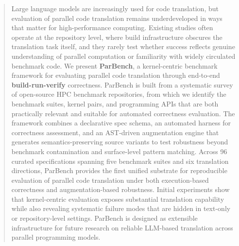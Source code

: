 \documentclass{article}
\begin{document}
\begin{abstract}
Large language models are increasingly used for code translation, but evaluation of parallel code translation remains underdeveloped in ways that matter for high-performance computing. Existing studies often operate at the repository level, where build infrastructure obscures the translation task itself, and they rarely test whether success reflects genuine understanding of parallel computation or familiarity with widely circulated benchmark code. We present \textbf{ParBench}, a kernel-centric benchmark framework for evaluating parallel code translation through end-to-end \textbf{build-run-verify} correctness. ParBench is built from a systematic survey of open-source HPC benchmark repositories, from which we identify the benchmark suites, kernel pairs, and programming APIs that are both practically relevant and suitable for automated correctness evaluation. The framework combines a declarative spec schema, an automated harness for correctness assessment, and an AST-driven augmentation engine that generates semantics-preserving source variants to test robustness beyond benchmark contamination and surface-level pattern matching. Across 96 curated specifications spanning five benchmark suites and six translation directions, ParBench provides the first unified substrate for reproducible evaluation of parallel code translation under both execution-based correctness and augmentation-based robustness. Initial experiments show that kernel-centric evaluation exposes substantial translation capability while also revealing systematic failure modes that are hidden in text-only or repository-level settings. ParBench is designed as extensible infrastructure for future research on reliable LLM-based translation across parallel programming models.
\end{abstract}
\end{document}

